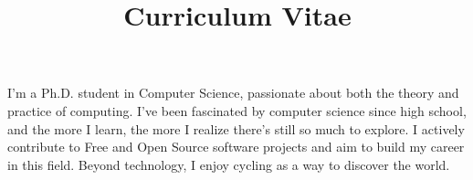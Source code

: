 \documentclass[a4paper,skipsamekey,11pt,english]{curve}
\title{Curriculum Vitae}
\begin{document}

\thispagestyle{firstpage}

\makeheaders[c]

\vspace*{-.5em}
I'm a Ph.D. student in Computer Science, passionate about both the theory and practice of computing. I've been fascinated by computer science since high school, and the more I learn, the more I realize there's still so much to explore. I actively contribute to Free and Open Source software projects and aim to build my career in this field. Beyond technology, I enjoy cycling as a way to discover the world.


\newpage
\thispagestyle{firstpage}


\end{document}
